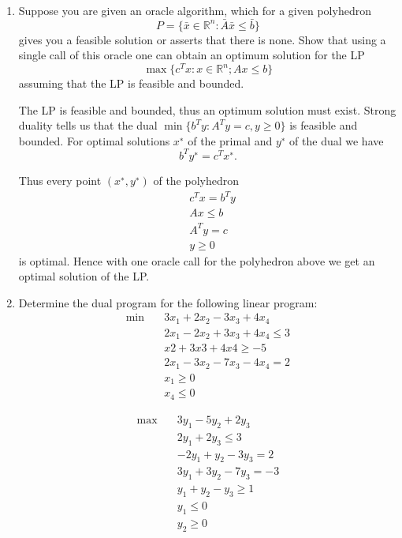 \documentclass[11pt]{article}
\institute{\'Ecole Polytechnique F\'ed\'erale de Lausanne}
\newcommand{\setR}{\mathbb{R}}
\renewcommand{\leq}{\leqslant}
\begin{document}
\makeheader

\begin{enumerate}[1)]

\item Suppose you are given an oracle algorithm, which for a given polyhedron
$$P= \{\bar{x}∈\setR^n: \bar{A}\bar{x} \leq \bar{b}\}$$
gives you a feasible solution or asserts that there is none. Show that using a single call of this oracle
one can obtain an optimum solution for the LP
$$\max\{c^T x : x∈\setR^n; Ax≤b\}$$
assuming that the LP is feasible and bounded.

\begin{solution}
The LP is feasible and bounded, thus an optimum solution must exist. Strong duality tells us that
the dual $\min\{b^T y: A^T y= c, y≥0\}$ is feasible and bounded. For optimal solutions $x^∗$ of the primal
and $y^∗$ of the dual we have $$b^T y^∗= c^T x^∗.$$

Thus every point $(x^∗,y^∗)$ of the polyhedron
\begin{align*}
&c^T x = b^T y \\
& Ax ≤ b \\
&A^T y= c \\
& y ≥ 0
\end{align*}
is optimal. Hence with one oracle call for the polyhedron above we get an optimal solution of the
LP.
\end{solution}


\item Determine the dual program for the following linear program:
\begin{align*}
\min \quad& 3x_1 + 2x_2−3x_3 + 4x_4 \\
&2x_1−2x_2 + 3x_3 + 4x_4 ≤ 3 \\
& x2 + 3x3 + 4x4 ≥ −5 \\
&2x_1−3x_2−7x_3−4x_4 = 2 \\
&x_1 ≥0 \\
& x_4 ≤0
\end{align*}

\begin{solution}
\begin{align*}
\max \quad &3y_1−5y_2 + 2y_3 \\
& 2y_1 + 2y_3 ≤ 3 \\
&−2y_1 + y_2−3y_3 = 2 \\
&3y_1 + 3y_2−7y_3 =−3 \\
& y_1 + y_2−y_3 ≥ 1\\
&y_1 ≤0 \\
& y_2 ≥0
\end{align*}
\end{solution}



\end{enumerate}
\end{document}
